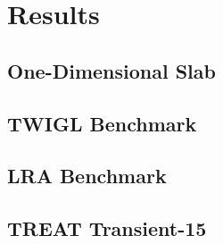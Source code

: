 \documentclass[8pt,xcolor=dvipnames]{beamer}
\begin{document}
\section{Results}

\subsection{One-Dimensional Slab}

\begin{frame}

\end{frame}

\subsection{TWIGL Benchmark}

\begin{frame}

\end{frame}

\subsection{LRA Benchmark}

\begin{frame}

\end{frame}

\subsection{TREAT Transient-15}
\end{document}
